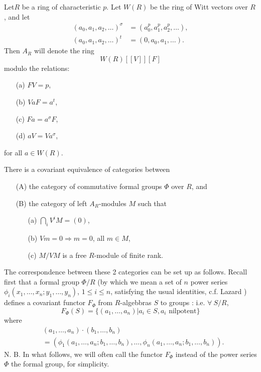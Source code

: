 \begin{defi*}
Let\pageoriginale $R$ be a ring of characteristic $p$. Let $W(R)$ be the ring of Witt vectors over $R$, and let
\begin{align*}
(a_{0},a_{1},a_{2},\ldots)^{\sigma} &= (a^{p}_{0},a^{p}_{1},a^{p}_{2},\ldots),\\[3pt]
(a_{0},a_{1},a_{2},\ldots)^{t} &= (0,a_{0},a_{1},\ldots). 
\end{align*}
Then $A_{R}$ will denote the ring
$$
W(R)[[V]][F]
$$
modulo the relations:
\begin{itemize}
\item[{\rm(a)}] $FV=p$,

\item[{\rm(b)}] $VaF=a^{t}$,

\item[{\rm(c)}] $Fa=a^{\sigma}F$,

\item[{\rm(d)}] $aV=Va^{\sigma}$,
\end{itemize}
for all $a\in W(R)$.
\end{defi*}

\begin{theorem*}
There is a covariant equivalence of categories between
\begin{itemize}
\item[{\rm(A)}] the category of commutative formal groups $\Phi$ over $R$, and

\item[{\rm(B)}] the category of left $A_{R}$-modules $M$ such that
\begin{itemize}
\item[{\rm(a)}] $\bigcap\limits_{i}V^{i}M=(0)$,

\item[{\rm(b)}] $Vm=0\Rightarrow m=0$, all $m\in M$,

\item[{\rm(c)}] $M/VM$ is a free $R$-module of finite rank.
\end{itemize}
\end{itemize}
\end{theorem*}

The correspondence between these 2 categories can be set up as follows. Recall first that a formal group $\Phi/R$ (by which we mean a set of $n$ power series $\phi_{i}(x_{1},\ldots,x_{n};y_{1},\ldots,y_{n})$, $1\leq i\leq n$, satisfying the usual identities, c.f. Lazard \cite{art15-key3}) defines a covariant functor $F_{\Phi}$ from $R$-algebbras $S$ to groups : i.e. $\forall \ S/R$,
$$
F_{\Phi}(S)=\{(a_{1},\ldots,a_{n})|a_{i}\in S, a_{i}\text{~nilpotent}\}
$$
where
\begin{align*}
&(a_{1},\ldots,a_{n})\cdot (b_{1},\ldots,b_{n})\\
&=(\phi_{1}(a_{1},\ldots,a_{n};b_{1},\ldots,b_{n}),\ldots,\phi_{n}(a_{1},\ldots,a_{n};b_{1},\ldots,b_{n})).
\end{align*}
N. B. In what follows, we will often call the functor $F_{\Phi}$ instead of the power series $\Phi$ the formal group, for simplicity.

